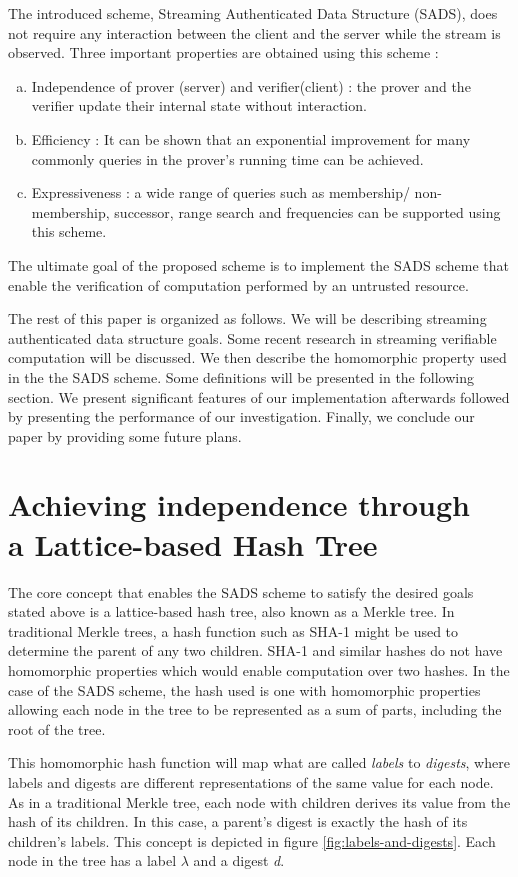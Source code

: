 \documentclass[11pt, letterpaper, oneside]{article}
\begin{document}
	The introduced scheme, Streaming Authenticated Data Structure (SADS), does not require any interaction between the client and the server while the stream is observed.
	Three important properties are obtained using this scheme :
	\begin{enumerate}[a.]
		\item Independence of prover (server) and verifier(client) : the prover and the verifier update their internal state without interaction.
		\item Efficiency : It can be shown that an exponential improvement for many commonly queries in the prover's running time can be achieved.
		\item Expressiveness : a wide range of queries such as membership/ non-membership, successor, range search and frequencies can be supported using this scheme.
	\end{enumerate} 
	The ultimate goal of the proposed scheme is to implement the SADS scheme that enable the verification of computation performed by an untrusted resource.
	
	The rest of this paper is organized as follows. We will be describing streaming authenticated data structure goals.
	Some recent research in streaming verifiable computation will be discussed.
	We then describe the homomorphic property used in the the SADS scheme. Some definitions will be presented in the following section.
	We present significant features of our implementation afterwards followed by presenting the performance of our investigation.
	Finally, we conclude our paper by providing some future plans.
	
	\section{ Achieving independence through \\ a Lattice-based Hash Tree }

	The core concept that enables the SADS scheme to satisfy the desired goals stated above is a lattice-based hash tree, also known as a Merkle tree.
	In traditional Merkle trees, a hash function such as SHA-1 might be used to determine the parent of any two children.
	SHA-1 and similar hashes do not have homomorphic properties which would enable computation over two hashes.
	In the case of the SADS scheme, the hash used is one with homomorphic properties allowing each node in the tree to be represented as a sum of parts, including the root of the tree.
	
	This homomorphic hash function will map what are called \textit{labels} to \textit{digests}, where labels and digests are different representations of the same value for each node.
	As in a traditional Merkle tree, each node with children derives its value from the hash of its children.
	In this case, a parent's digest is exactly the hash of its children's labels.
	This concept is depicted in figure \ref{fig:labels-and-digests}.	
	Each node in the tree has a label $\lambda$ and a digest \textit{d}.
	
\end{document}
